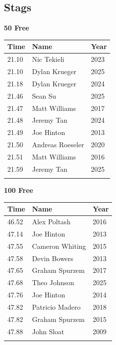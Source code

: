 \subsection{Stags}
\vspace{1.2em}
\noindent\begin{minipage}[t]{0.48\textwidth}
\centering
\textbf{\textcolor{teamprimary}{50 Free}}\par
\vspace{0.5em}
\centering
\small
\renewcommand{\arraystretch}{1.0}
\setlength{\tabcolsep}{4pt}
\begin{tabular}{@{}p{1.8cm}p{3.0cm}p{1.0cm}@{}}
\toprule
\textbf{Time} & \textbf{Name} & \textbf{Year} \\
\midrule
21.10 & Nic Tekieli & 2023 \\
21.10 & Dylan Krueger & 2025 \\
21.18 & Dylan Krueger & 2024 \\
21.46 & Sean Su & 2025 \\
21.47 & Matt Williams & 2017 \\
21.48 & Jeremy Tan & 2024 \\
21.49 & Joe Hinton & 2013 \\
21.50 & Andreas Roeseler & 2020 \\
21.51 & Matt Williams & 2016 \\
21.59 & Jeremy Tan & 2025 \\
\bottomrule
\vspace{0.5em}
\end{tabular}
\end{minipage}
\hfill
\begin{minipage}[t]{0.48\textwidth}
\centering
\textbf{\textcolor{teamprimary}{100 Free}}\par
\vspace{0.5em}
\centering
\small
\renewcommand{\arraystretch}{1.0}
\setlength{\tabcolsep}{4pt}
\begin{tabular}{@{}p{1.8cm}p{3.0cm}p{1.0cm}@{}}
\toprule
\textbf{Time} & \textbf{Name} & \textbf{Year} \\
\midrule
46.52 & Alex Poltash & 2016 \\
47.14 & Joe Hinton & 2013 \\
47.55 & Cameron Whiting & 2015 \\
47.58 & Devin Bowers & 2013 \\
47.65 & Graham Spurzem & 2017 \\
47.68 & Theo Johnson & 2025 \\
47.76 & Joe Hinton & 2014 \\
47.82 & Patricio Madero & 2018 \\
47.82 & Graham Spurzem & 2015 \\
47.88 & John Sloat & 2009 \\
\bottomrule
\vspace{0.5em}
\end{tabular}
\end{minipage}
